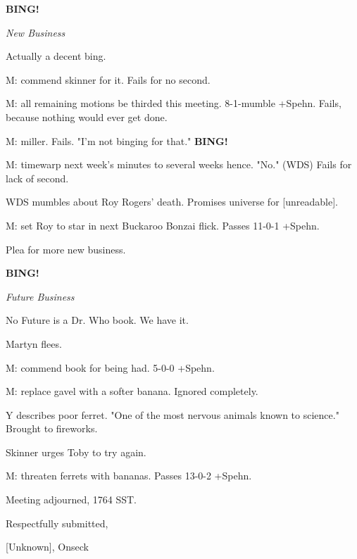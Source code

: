 \documentclass[12pt]{article}
\newcommand{\bing}{{\bf BING!} }
\newcommand{\goto}[1]{\bing \vskip 12pt \centerline{{\em{#1}}}}
\begin{document}
\goto{New Business}

Actually a decent bing.

M: commend skinner for it. Fails for no second.

M: all remaining motions be thirded this meeting. 8-1-mumble +Spehn. Fails, because nothing would ever get done.

M: miller. Fails. "I'm not binging for that." \bing

M: timewarp next week's minutes to several weeks hence. "No." (WDS) Fails for lack of second.

WDS mumbles about Roy Rogers' death. Promises universe for [unreadable].

M: set Roy to star in next Buckaroo Bonzai flick. Passes 11-0-1 +Spehn.

Plea for more new business.

\goto{Future Business}

No Future is a Dr. Who book. We have it.

Martyn flees.

M: commend book for being had. 5-0-0 +Spehn.

M: replace gavel with a softer banana. Ignored completely.

Y describes poor ferret. "One of the most nervous animals known to science." Brought to fireworks.

Skinner urges Toby to try again.

M: threaten ferrets with bananas. Passes 13-0-2 +Spehn.

\vspace{12pt}

\noindent
Meeting adjourned, 1764 SST.

\vspace{18pt}

\centerline{Respectfully submitted,}
\centerline{[Unknown], Onseck}
\end{document}
